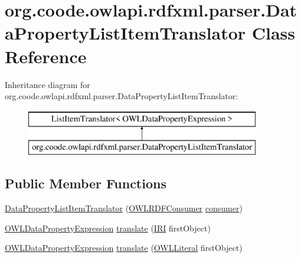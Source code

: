 \hypertarget{classorg_1_1coode_1_1owlapi_1_1rdfxml_1_1parser_1_1_data_property_list_item_translator}{\section{org.\-coode.\-owlapi.\-rdfxml.\-parser.\-Data\-Property\-List\-Item\-Translator Class Reference}
\label{classorg_1_1coode_1_1owlapi_1_1rdfxml_1_1parser_1_1_data_property_list_item_translator}
}
Inheritance diagram for org.\-coode.\-owlapi.\-rdfxml.\-parser.\-Data\-Property\-List\-Item\-Translator\-:\begin{figure}[H]
\begin{center}
\leavevmode
\includegraphics[height=2.000000cm]{classorg_1_1coode_1_1owlapi_1_1rdfxml_1_1parser_1_1_data_property_list_item_translator}
\end{center}
\end{figure}
\subsection*{Public Member Functions}
\begin{DoxyCompactItemize}
\item 
\hyperlink{classorg_1_1coode_1_1owlapi_1_1rdfxml_1_1parser_1_1_data_property_list_item_translator_a4d0ede6f6ab1e9e70beda832d92170ec}{Data\-Property\-List\-Item\-Translator} (\hyperlink{classorg_1_1coode_1_1owlapi_1_1rdfxml_1_1parser_1_1_o_w_l_r_d_f_consumer}{O\-W\-L\-R\-D\-F\-Consumer} \hyperlink{classorg_1_1coode_1_1owlapi_1_1rdfxml_1_1parser_1_1_data_property_list_item_translator_a04fba3154929d2aa5975d33e97cbfdb3}{consumer})
\item 
\hyperlink{interfaceorg_1_1semanticweb_1_1owlapi_1_1model_1_1_o_w_l_data_property_expression}{O\-W\-L\-Data\-Property\-Expression} \hyperlink{classorg_1_1coode_1_1owlapi_1_1rdfxml_1_1parser_1_1_data_property_list_item_translator_a7633a9fb989c04bd6cde780e07de0fad}{translate} (\hyperlink{classorg_1_1semanticweb_1_1owlapi_1_1model_1_1_i_r_i}{I\-R\-I} first\-Object)
\item 
\hyperlink{interfaceorg_1_1semanticweb_1_1owlapi_1_1model_1_1_o_w_l_data_property_expression}{O\-W\-L\-Data\-Property\-Expression} \hyperlink{classorg_1_1coode_1_1owlapi_1_1rdfxml_1_1parser_1_1_data_property_list_item_translator_adba1e46dece0819206ecc741a754cd8c}{translate} (\hyperlink{interfaceorg_1_1semanticweb_1_1owlapi_1_1model_1_1_o_w_l_literal}{O\-W\-L\-Literal} first\-Object)
\end{DoxyCompactItemize}

